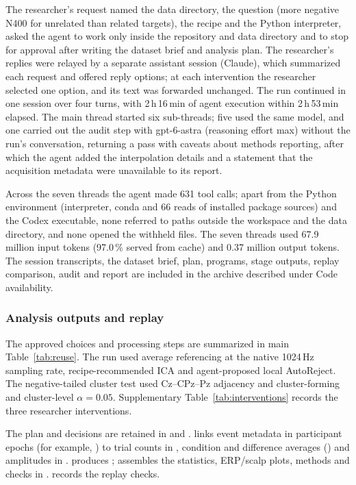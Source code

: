 The researcher's request named the data directory, the question (more negative N400 for unrelated than related targets), the recipe and the Python interpreter, asked the agent to work only inside the repository and data directory and to stop for approval after writing the dataset brief and analysis plan. The researcher's replies were relayed by a separate assistant session (Claude), which summarized each request and offered reply options; at each intervention the researcher selected one option, and its text was forwarded unchanged. The run continued in one session over four turns, with 2\,h\,16\,min of agent execution within 2\,h\,53\,min elapsed. The main thread started six sub-threads; five used the same model, and one carried out the audit step with gpt-6-astra (reasoning effort max) without the run's conversation, returning a pass with caveats about methods reporting, after which the agent added the interpolation details and a statement that the acquisition metadata were unavailable to its report.

Across the seven threads the agent made 631 tool calls; apart from the Python environment (interpreter, conda and 66 reads of installed package sources) and the Codex executable, none referred to paths outside the workspace and the data directory, and none opened the withheld files. The seven threads used 67.9 million input tokens (97.0\,\% served from cache) and 0.37 million output tokens. The session transcripts, the dataset brief, plan, programs, stage outputs, replay comparison, audit and report are included in the archive described under Code availability.

\subsubsection*{Analysis outputs and replay}

The approved choices and processing steps are summarized in main Table~\ref*{tab:reuse}. The run used average referencing at the native 1024\,Hz sampling rate, recipe-recommended ICA and agent-proposed local AutoReject. The negative-tailed cluster test used Cz--CPz--Pz adjacency and cluster-forming and cluster-level $\alpha=0.05$. Supplementary Table~\ref*{tab:interventions} records the three researcher interventions.

The plan and decisions are retained in  and .  links event metadata in participant epochs (for example, ) to trial counts in , condition and difference averages () and amplitudes in .  produces ;  assembles the statistics, ERP/scalp plots, methods and checks in .  records the replay checks.

